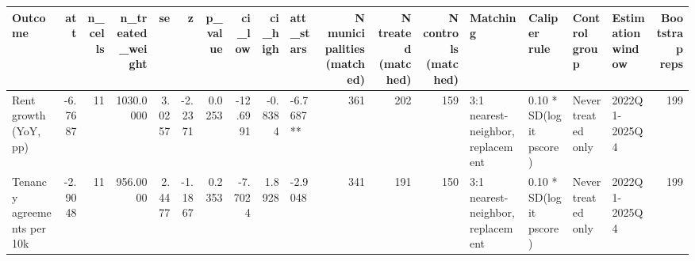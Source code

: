 \begin{tabular}{lrrrrrrrrlrrrllllr}
\toprule
Outcome & att & n_cells & n_treated_weight & se & z & p_value & ci_low & ci_high & att_stars & N municipalities (matched) & N treated (matched) & N controls (matched) & Matching & Caliper rule & Control group & Estimation window & Bootstrap reps \\
\midrule
Rent growth (YoY, pp) & -6.7687 & 11 & 1030.0000 & 3.0257 & -2.2371 & 0.0253 & -12.6991 & -0.8384 & -6.7687** & 361 & 202 & 159 & 3:1 nearest-neighbor, replacement & 0.10 * SD(logit pscore) & Never treated only & 2022Q1-2025Q4 & 199 \\
Tenancy agreements per 10k & -2.9048 & 11 & 956.0000 & 2.4477 & -1.1867 & 0.2353 & -7.7024 & 1.8928 & -2.9048 & 341 & 191 & 150 & 3:1 nearest-neighbor, replacement & 0.10 * SD(logit pscore) & Never treated only & 2022Q1-2025Q4 & 199 \\
\bottomrule
\end{tabular}
